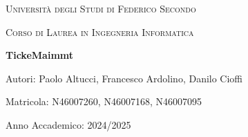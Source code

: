 \documentclass[openany]{book}
\begin{document}
\begin{titlepage}

    \centering
    {\scshape\LARGE Università degli Studi di Federico Secondo \par}
    \vspace{1cm}
    {\scshape\Large Corso di Laurea in Ingegneria Informatica \par}
    \vfill
    {\huge\bfseries TickeMaimmt \par}
    \vspace{2cm}
    {\Large Autori: Paolo Altucci, Francesco Ardolino, Danilo Cioffi \par}
    \vspace{0.5cm}
    {\Large Matricola: N46007260, N46007168, N46007095 \par}
    \vspace{0.5cm}
    {\Large Anno Accademico: 2024/2025 \par}
    \vfill


\tableofcontents
\newpage
\end{titlepage}








\end{document}
